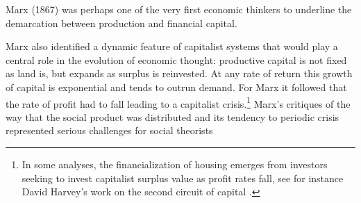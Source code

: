 Marx (1867) was perhaps one of the very first economic thinkers to underline the demarcation between production and financial capital. 





Marx also identified a dynamic feature of capitalist systems that would play a central role in the evolution of economic thought: productive capital is not fixed as land is, but expands as surplus is reinvested. At any rate of return this growth of capital is exponential and tends to outrun demand. %
For Marx it followed that  the rate of profit had to fall leading to a capitalist crisis.\footnote{In some analyses, the financialization of housing emerges from investors seeking to invest capitalist surplus value as profit rates fall, see for instance David Harvey's work on \gls{the second circuit of capital} \cite{GET_david_harvey}.} 
Marx's critiques of the way that the social product was distributed and its tendency to periodic crisis represented serious challenges for social theorists 

